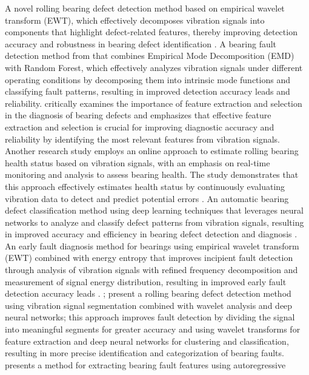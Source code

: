 \documentclass[sn-basic,pdflatex]{sn-jnl}
\theoremstyle{remark}
\theoremstyle{definition}
\begin{document}
A novel rolling bearing defect detection method based on empirical
wavelet transform (EWT), which effectively decomposes vibration signals
into components that highlight defect-related features, thereby
improving detection accuracy and robustness in bearing defect
identification \citep{WOS:000467079500501}. A bearing fault detection
method from \citet{WOS:000459864800144} that combines Empirical Mode
Decomposition (EMD) with Random Forest, which effectively analyzes
vibration signals under different operating conditions by decomposing
them into intrinsic mode functions and classifying fault patterns,
resulting in improved detection accuracy leads and reliability.
\citet{WOS:000458657500187} critically examines the importance of
feature extraction and selection in the diagnosis of bearing defects and
emphasizes that effective feature extraction and selection is crucial
for improving diagnostic accuracy and reliability by identifying the
most relevant features from vibration signals. Another research study
employs an online approach to estimate rolling bearing health status
based on vibration signals, with an emphasis on real-time monitoring and
analysis to assess bearing health. The study demonstrates that this
approach effectively estimates health status by continuously evaluating
vibration data to detect and predict potential errors
\citep{WOS:000452922000015}. An automatic bearing defect classification
method using deep learning techniques that leverages neural networks to
analyze and classify defect patterns from vibration signals, resulting
in improved accuracy and efficiency in bearing defect detection and
diagnosis \citep[000453413600001]{WOS}. An early fault diagnosis method
for bearings using empirical wavelet transform (EWT) combined with
energy entropy that improves incipient fault detection through analysis
of vibration signals with refined frequency decomposition and
measurement of signal energy distribution, resulting in improved early
fault detection accuracy leads \citep[:000452819600235]{WOS}.
\citet{WOS:000450745100001}; \citet{WOS:000449334500118} present a
rolling bearing defect detection method using vibration signal
segmentation combined with wavelet analysis and deep neural networks;
this approach improves fault detection by dividing the signal into
meaningful segments for greater accuracy and using wavelet transforms
for feature extraction and deep neural networks for clustering and
classification, resulting in more precise identification and
categorization of bearing faults. \citet{WOS:000440977000032} presents a
method for extracting bearing fault features using autoregressive
\end{document}
